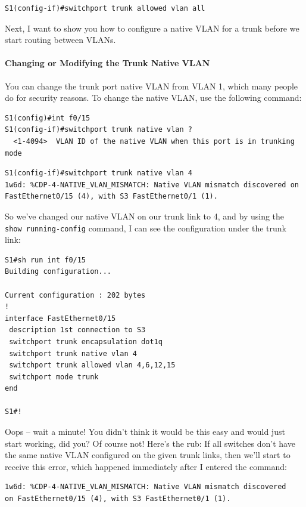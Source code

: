 \begin{verbatim}
S1(config-if)#switchport trunk allowed vlan all
\end{verbatim}

Next, I want to show you how to configure a native VLAN for a trunk
before we start routing between VLANs.

\paragraph{Changing or Modifying the Trunk Native VLAN}

You can change the trunk port native VLAN from VLAN 1, which many people
do for security reasons. To change the native VLAN, use the following
command:

\begin{verbatim}
S1(config)#int f0/15
S1(config-if)#switchport trunk native vlan ?
  <1-4094>  VLAN ID of the native VLAN when this port is in trunking mode
\end{verbatim}

\begin{verbatim}
S1(config-if)#switchport trunk native vlan 4
1w6d: %CDP-4-NATIVE_VLAN_MISMATCH: Native VLAN mismatch discovered on FastEthernet0/15 (4), with S3 FastEthernet0/1 (1).
\end{verbatim}

So we've changed our native VLAN on our trunk link to 4, and by using
the \texttt{show\ running-config} command, I can see the configuration
under the trunk link:

\begin{verbatim}
S1#sh run int f0/15
Building configuration...
 
Current configuration : 202 bytes
!
interface FastEthernet0/15
 description 1st connection to S3
 switchport trunk encapsulation dot1q
 switchport trunk native vlan 4
 switchport trunk allowed vlan 4,6,12,15
 switchport mode trunk
end
 
S1#!
\end{verbatim}

Oops -- wait a minute!
You didn't think it would be this easy and would just start working, did
you? Of course not! Here's the rub: If all switches don't have the same
native VLAN configured on the given trunk links, then we'll start to
receive this error, which happened immediately after I entered the
command:

\begin{verbatim}
1w6d: %CDP-4-NATIVE_VLAN_MISMATCH: Native VLAN mismatch discovered
on FastEthernet0/15 (4), with S3 FastEthernet0/1 (1).
\end{verbatim}

